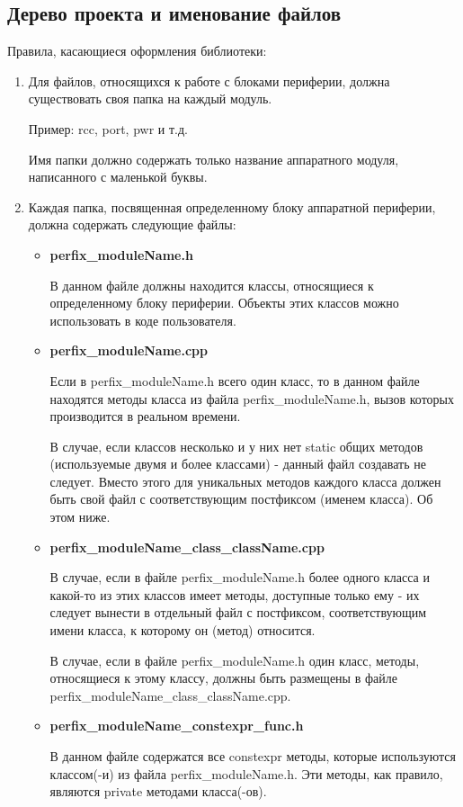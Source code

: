 \subsection{Дерево проекта и именование файлов}
\label{dn:0}
Правила, касающиеся оформления библиотеки:
\begin{enumerate}
	\item Для файлов, относящихся к работе с блоками периферии, должна существовать своя папка на каждый модуль.
	
	Пример: rcc, port, pwr и т.д.
	
	Имя папки должно содержать только название аппаратного модуля, написанного с маленькой буквы.
	\item Каждая папка, посвященная определенному блоку аппаратной периферии, должна содержать следующие файлы:
	\begin{itemize}
		\item \textbf{perfix\_moduleName.h}
		
		В данном файле должны находится классы, относящиеся к определенному блоку периферии. Объекты этих классов можно использовать в коде пользователя.
		\item \textbf{perfix\_moduleName.cpp}
		
		Если в perfix\_moduleName.h всего один класс, то в данном файле находятся методы класса из файла perfix\_moduleName.h, вызов которых производится в реальном времени. 
		
		В случае, если классов несколько и у них нет static общих методов (используемые двумя и более классами) - данный файл создавать не следует. Вместо этого для уникальных методов каждого класса должен быть свой файл с соответствующим постфиксом (именем класса). Об этом ниже.
		\item \textbf{perfix\_moduleName\_class\_className.cpp}
		
		В случае, если в файле perfix\_moduleName.h более одного класса и какой-то из этих классов имеет методы, доступные только ему - их следует вынести в отдельный файл с постфиксом, соответствующим имени класса, к которому он (метод) относится. 
		
		В случае, если в файле perfix\_moduleName.h один класс, методы, относящиеся к этому классу, должны быть размещены в файле perfix\_\-moduleName\_\-class\_\-className.cpp.
		
		\item \textbf{perfix\_moduleName\_constexpr\_func.h}
		
		В данном файле содержатся все constexpr методы, которые используются классом(-и) из файла perfix\_moduleName.h. Эти методы, как правило, являются private методами класса(-ов). 
		

\end{itemize}
\end{enumerate}
